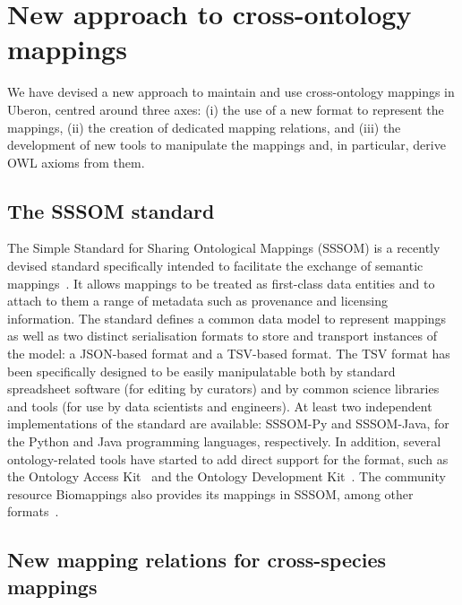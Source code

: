 \documentclass{ceurart}
\begin{document}
\section{New approach to cross-ontology mappings}

We have devised a new approach to maintain and use cross-ontology
mappings in Uberon, centred around three axes: (i) the use of a new
format to represent the mappings, (ii) the creation of dedicated mapping
relations, and (iii) the development of new tools to manipulate the
mappings and, in particular, derive OWL axioms from them.

\subsection{The SSSOM standard}

The Simple Standard for Sharing Ontological Mappings (SSSOM) is a
recently devised standard specifically intended to facilitate the
exchange of semantic mappings~\cite{matentzoglu2022b}. It allows
mappings to be treated as first-class data entities and to attach to
them a range of metadata such as provenance and licensing information.
The standard defines a common data model to represent mappings as well
as two distinct serialisation formats to store and transport instances
of the model: a JSON-based format and a TSV-based format. The TSV format
has been specifically designed to be easily manipulatable both by
standard spreadsheet software (for editing by curators) and by common
science libraries and tools (for use by data scientists and engineers).
At least two independent implementations of the standard are available:
SSSOM-Py and SSSOM-Java, for the Python and Java programming languages,
respectively. In addition, several ontology-related tools have started
to add direct support for the format, such as the Ontology Access
Kit~\cite{mungall2023} and the Ontology Development
Kit~\cite{matentzoglu2022a}. The community resource Biomappings also
provides its mappings in SSSOM, among other formats~\cite{hoyt2023}.

\subsection{New mapping relations for cross-species mappings}
\end{document}
